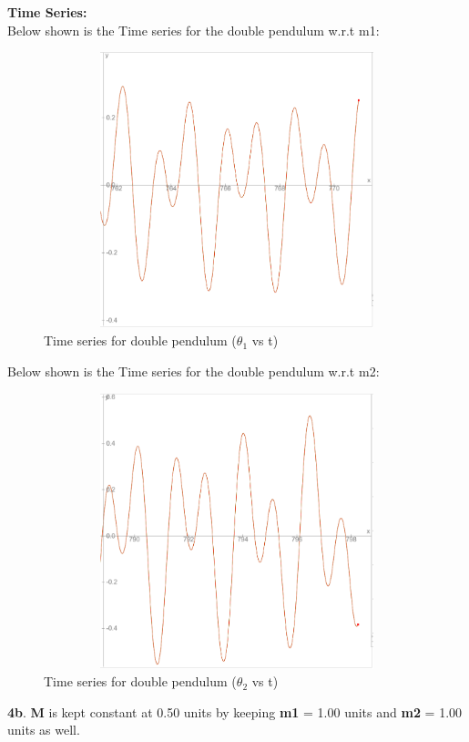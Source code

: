 \documentclass[11pt]{scrartcl} %
\begin{document}
\newpage
\textbf{Time Series:}\\
Below shown is the Time series for the double pendulum w.r.t m1:
\begin{figure}[h] %
	\centering
	\includegraphics[width=12cm, height=8cm]{4a_time(1).PNG} %
	\caption{Time series for double pendulum ($\theta_{1}$ vs t)}
\end{figure}

Below shown is the Time series for the double pendulum w.r.t m2:
\begin{figure}[h] %
	\centering
	\includegraphics[width=12cm, height=8cm]{4a_time(2).PNG} %
	\caption{Time series for double pendulum ($\theta_{2}$ vs t)}
\end{figure}


\newpage
\textbf{4b}.
\textbf{M} is kept constant at 0.50 units by keeping \textbf{m1} = 1.00 units and \textbf{m2} = 1.00 units as well.\\
\end{document}
